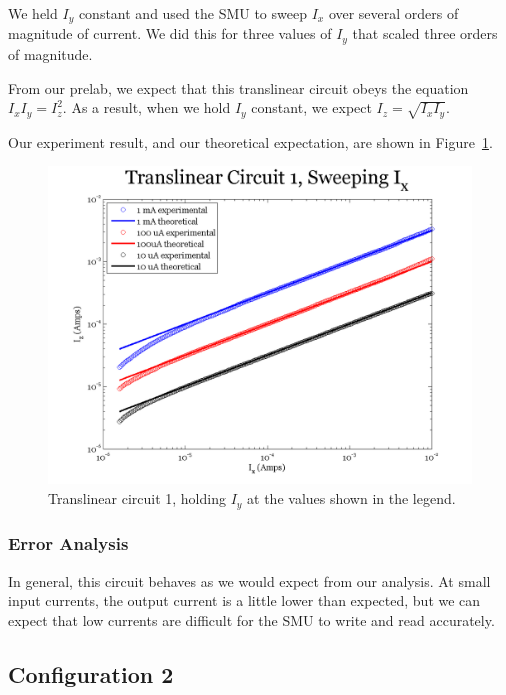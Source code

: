 \documentclass{article}
\begin{document}
We held $I_y$ constant and used the SMU to sweep $I_x$ over several orders of magnitude of current.   We did this for three values of $I_y$ that scaled three orders of magnitude.

From our prelab, we expect that this translinear circuit obeys the equation $I_x I_y = I_z ^2$.  As a result, when we hold $I_y$ constant, we expect $I_z = \sqrt{I_xI_y}$.  

Our experiment result, and our theoretical expectation, are shown in Figure~\ref{fig:exp2sweepx}.

\begin{figure}[H]
\begin{center}
\includegraphics[scale=.75]{exp2_sweepx.png}
\caption{Translinear circuit 1, holding $I_y$ at the values shown in the legend.}
\label{fig:exp2sweepx}
\end{center}
\end{figure}

\subsubsection*{Error Analysis}

In general, this circuit behaves as we would expect from our analysis.  At small input currents, the output current is a little lower than expected, but we can expect that low currents are difficult for the SMU to write and read accurately.

\subsection*{Configuration 2}
\end{document}
